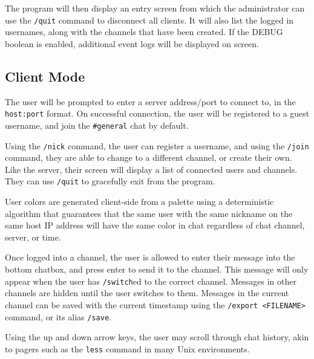 \documentclass{article}
\begin{document}
The program will then display an entry screen from which the administrator can use the \verb|/quit| command to disconnect all clients. It will also list the logged in usernames, along with the channels that have been created. If the DEBUG boolean is enabled, additional event logs will be displayed on screen.

\subsection{Client Mode}
The user will be prompted to enter a server address/port to connect to, in the \verb|host:port| format. On successful connection, the user will be registered to a guest username, and join the \verb|#general| chat by default.

Using the \verb|/nick| command, the user can register a username, and using the \verb|/join| command, they are able to change to a different channel, or create their own. Like the server, their screen will display a list of connected users and channels. They can use \verb|/quit| to gracefully exit from the program.

User colors are generated client-side from a palette using a deterministic algorithm that guarantees that the same user with the same nickname on the same host IP address will have the same color in chat regardless of chat channel, server, or time.

Once logged into a channel, the user is allowed to enter their message into the bottom chatbox, and press enter to send it to the channel. This message will only appear when the user has \verb|/switch|ed to the correct channel. Messages in other channels are hidden until the user switches to them.
Messages in the current channel can be saved with the current timestamp using the \verb|/export <FILENAME>| command, or its alias \verb|/save|.

Using the up and down arrow keys, the user may scroll through chat history, akin to pagers such as the \verb|less| command in many Unix environments.
\end{document}
